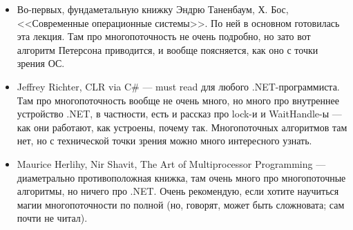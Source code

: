 \documentclass{../../text-style}
\begin{document}
\begin{itemize}
    \item Во-первых, фундаметальную книжку Эндрю Таненбаум, Х. Бос, <<Современные операционные системы>>. По ней в основном готовилась эта лекция. Там про многопоточность не очень подробно, но зато вот алгоритм Петерсона приводится, и вообще поясняется, как оно с точки зрения ОС.
    \item Jeffrey Richter, CLR via C\# --- must read для любого .NET-программиста. Там про многопоточность вообще не очень много, но много про внутреннее устройство .NET, в частности, есть и рассказ про lock-и и WaitHandle-ы --- как они работают, как устроены, почему так. Многопоточных алгоритмов там нет, но с технической точки зрения можно много интересного узнать.
    \item Maurice Herlihy, Nir Shavit, The Art of Multiprocessor Programming --- диаметрально противоположная книжка, там очень много про многопоточные алгоритмы, но ничего про .NET. Очень рекомендую, если хотите научиться магии многопоточности по полной (но, говорят, может быть сложновата; сам почти не читал).
\end{itemize}
\end{document}
